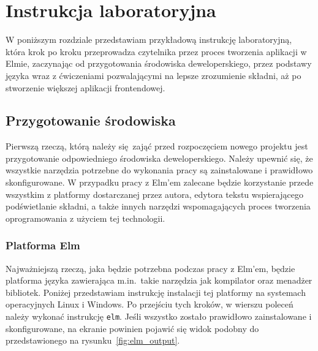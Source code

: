 \documentclass[twoside,a4paper]{report}
\begin{document}

\chapter{Instrukcja laboratoryjna}
W poniższym rozdziale przedstawiam przykładową instrukcję laboratoryjną, która krok po kroku przeprowadza czytelnika przez proces tworzenia aplikacji w Elmie, zaczynając od przygotowania środowiska deweloperskiego, przez podstawy języka wraz z ćwiczeniami pozwalającymi na lepsze zrozumienie składni, aż po stworzenie większej aplikacji frontendowej.

\section{Przygotowanie środowiska}
Pierwszą rzeczą, którą należy się zająć przed rozpoczęciem nowego projektu jest przygotowanie odpowiedniego środowiska deweloperskiego.
Należy upewnić się, że wszystkie narzędzia potrzebne do wykonania pracy są zainstalowane i prawidłowo skonfigurowane.
W przypadku pracy z Elm'em zalecane będzie korzystanie przede wszystkim z platformy dostarczanej przez autora, edytora tekstu wspierającego podświetlanie składni, a także innych narzędzi wspomagających proces tworzenia oprogramowania z użyciem tej technologii.

\subsection{Platforma Elm}
Najważniejszą rzeczą, jaka będzie potrzebna podczas pracy z Elm'em, będzie platforma języka zawierająca m.in.~takie narzędzia jak kompilator oraz menadżer bibliotek.
Poniżej przedstawiam instrukcję instalacji tej platformy na systemach operacyjnych Linux i Windows.
Po przejściu tych kroków, w wierszu poleceń należy wykonać instrukcję \texttt{elm}.
Jeśli wszystko zostało prawidłowo zainstalowane i skonfigurowane, na ekranie powinien pojawić się widok podobny do przedstawionego na rysunku~\ref{fig:elm_output}.
\end{document}

